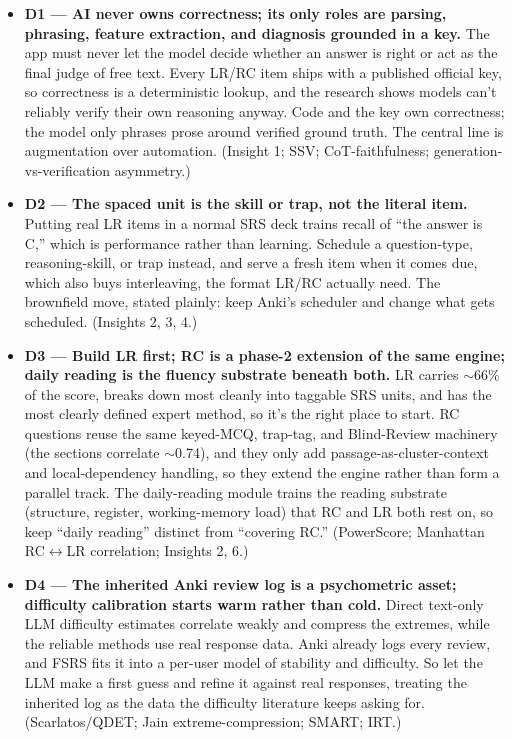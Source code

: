\documentclass[11pt]{article}
\begin{document}
\begin{itemize}
\item \textbf{D1 --- AI never owns correctness; its only roles are parsing, phrasing, feature extraction, and diagnosis grounded in a key.} The app must never let the model decide whether an answer is right or act as the final judge of free text. Every LR/RC item ships with a published official key, so correctness is a deterministic lookup, and the research shows models can't reliably verify their own reasoning anyway. Code and the key own correctness; the model only phrases prose around verified ground truth. The central line is augmentation over automation. (Insight 1; SSV; CoT-faithfulness; generation-vs-verification asymmetry.)
\item \textbf{D2 --- The spaced unit is the skill or trap, not the literal item.} Putting real LR items in a normal SRS deck trains recall of \enquote{the answer is C,} which is performance rather than learning. Schedule a question-type, reasoning-skill, or trap instead, and serve a fresh item when it comes due, which also buys interleaving, the format LR/RC actually need. The brownfield move, stated plainly: keep Anki's scheduler and change what gets scheduled. (Insights 2, 3, 4.)
\item \textbf{D3 --- Build LR first; RC is a phase-2 extension of the same engine; daily reading is the fluency substrate beneath both.} LR carries $\sim$66\% of the score, breaks down most cleanly into taggable SRS units, and has the most clearly defined expert method, so it's the right place to start. RC questions reuse the same keyed-MCQ, trap-tag, and Blind-Review machinery (the sections correlate $\sim$0.74), and they only add passage-as-cluster-context and local-dependency handling, so they extend the engine rather than form a parallel track. The daily-reading module trains the reading substrate (structure, register, working-memory load) that RC and LR both rest on, so keep \enquote{daily reading} distinct from \enquote{covering RC.} (PowerScore; Manhattan RC$\leftrightarrow$LR correlation; Insights 2, 6.)
\item \textbf{D4 --- The inherited Anki review log is a psychometric asset; difficulty calibration starts warm rather than cold.} Direct text-only LLM difficulty estimates correlate weakly and compress the extremes, while the reliable methods use real response data. Anki already logs every review, and FSRS fits it into a per-user model of stability and difficulty. So let the LLM make a first guess and refine it against real responses, treating the inherited log as the data the difficulty literature keeps asking for. (Scarlatos/QDET; Jain extreme-compression; SMART; IRT.)

\end{itemize}
\end{document}
